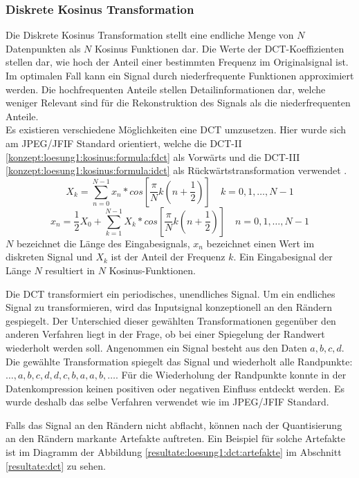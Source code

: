 \subsubsection{Diskrete Kosinus Transformation} \label{konzept:loesung1:kosinus}
Die Diskrete Kosinus Transformation stellt eine endliche Menge von $N$ Datenpunkten als $N$ Kosinus Funktionen dar. Die Werte der DCT-Koeffizienten stellen dar, wie hoch der Anteil einer bestimmten Frequenz im Originalsignal ist. Im optimalen Fall kann ein Signal durch niederfrequente Funktionen approximiert werden. Die hochfrequenten Anteile stellen Detailinformationen dar, welche weniger Relevant sind für die Rekonstruktion des Signals als die niederfrequenten Anteile.\\
Es existieren verschiedene Möglichkeiten eine DCT umzusetzen. Hier wurde sich am JPEG/JFIF Standard orientiert, welche die DCT-II \eqref{konzept:loesung1:kosinus:formula:fdct} als Vorwärts und die DCT-III \eqref{konzept:loesung1:kosinus:formula:idct} als Rückwärtstransformation verwendet \cite{wallace1992jpeg}. 
\begin{equation} \label{konzept:loesung1:kosinus:formula:fdct}
	X_k = \sum_{n=0}^{N-1}x_n*cos[\frac{\pi}{N}k(n+\frac{1}{2})] \quad k = 0, 1, \ldots, N-1
\end{equation}
\begin{equation} \label{konzept:loesung1:kosinus:formula:idct}
x_n  = \frac{1}{2}X_0 + \sum_{k=1}^{N-1}X_k*cos[\frac{\pi}{N}k(n+\frac{1}{2})] \quad n = 0,1,\ldots,N-1
\end{equation}
$N$ bezeichnet die Länge des Eingabesignals, $x_n$ bezeichnet einen Wert im diskreten Signal und $X_k$ ist der Anteil der Frequenz $k$. Ein Eingabesignal der Länge $N$ resultiert in $N$ Kosinus-Funktionen.

Die DCT transformiert ein periodisches, unendliches Signal. Um ein endliches Signal zu transformieren, wird das Inputsignal konzeptionell an den Rändern gespiegelt. Der Unterschied dieser gewählten Transformationen gegenüber den anderen Verfahren liegt in der Frage, ob bei einer Spiegelung der Randwert wiederholt werden soll. Angenommen ein Signal besteht aus den Daten $a,b,c,d$. Die gewählte Transformation spiegelt das Signal und wiederholt alle Randpunkte: $\ldots,a,b,c,d,d,c,b,a,a,b,\ldots$. Für die Wiederholung der Randpunkte konnte in der Datenkompression keinen positiven oder negativen Einfluss entdeckt werden. Es wurde deshalb das selbe Verfahren verwendet wie im JPEG/JFIF Standard.

Falls das Signal an den Rändern nicht abflacht, können nach der Quantisierung an den Rändern markante Artefakte auftreten. Ein Beispiel für solche Artefakte ist im Diagramm der Abbildung \ref{resultate:loesung1:dct:artefakte} im Abschnitt \ref{resultate:dct} zu sehen.

